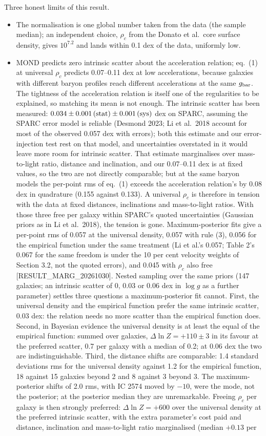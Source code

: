 \documentclass[
  10pt,
]{article}
\begin{document}
Three honest limits of this result.
\begin{itemize}
\item[(i)] The normalisation is one global number taken from the data (the sample median); an independent choice, $\rho_c$ from the Donato et al.~core surface density, gives $10^{7.2}$ and lands within 0.1 dex of the data, uniformly low.
\item[(ii)] MOND predicts zero intrinsic scatter about the acceleration relation; eq.~(1) at universal $\rho_c$ predicts 0.07--0.11 dex at low accelerations, because galaxies with different baryon profiles reach different accelerations at the same $g_{\rm bar}$. The tightness of the acceleration relation is itself one of the regularities to be explained, so matching its mean is not enough. The intrinsic scatter has been measured: $0.034\pm0.001\,{\rm(stat)}\pm0.001\,{\rm(sys)}$ dex on SPARC, assuming the SPARC error model is reliable (Desmond 2023; Li et al.~2018 account for most of the observed 0.057 dex with errors); both this estimate and our error-injection test rest on that model, and uncertainties overstated in it would leave more room for intrinsic scatter. That estimate marginalises over mass-to-light ratio, distance and inclination, and our 0.07--0.11 dex is at fixed values, so the two are not directly comparable; but at the same baryon models the per-point rms of eq.~(1) exceeds the acceleration relation's by 0.08 dex in quadrature (0.155 against 0.133). A universal $\rho_c$ is therefore in tension with the data at fixed distances, inclinations and mass-to-light ratios. With those three free per galaxy within SPARC's quoted uncertainties (Gaussian priors as in Li et al.~2018), the tension is gone. Maximum-posterior fits give a per-point rms of 0.057 at the universal density, 0.057 with rule (3), 0.056 for the empirical function under the same treatment (Li et al.'s 0.057; Table 2's 0.067 for the same freedom is under the 10 per cent velocity weights of Section 3.2, not the quoted errors), and 0.045 with $\rho_c$ also free {[}RESULT\_MARG\_20261030{]}. Nested sampling over the same priors (147 galaxies; an intrinsic scatter of 0, 0.03 or 0.06 dex in $\log g$ as a further parameter) settles three questions a maximum-posterior fit cannot. First, the universal density and the empirical function prefer the same intrinsic scatter, 0.03 dex: the relation needs no more scatter than the empirical function does. Second, in Bayesian evidence the universal density is at least the equal of the empirical function: summed over galaxies, $\Delta\ln Z=+110\pm3$ in its favour at the preferred scatter, 0.7 per galaxy with a median of 0.2; at 0.06 dex the two are indistinguishable. Third, the distance shifts are comparable: 1.4 standard deviations rms for the universal density against 1.2 for the empirical function, 18 against 15 galaxies beyond 2 and 8 against 3 beyond 3. The maximum-posterior shifts of 2.0 rms, with IC 2574 moved by $-10$, were the mode, not the posterior; at the posterior median they are unremarkable. Freeing $\rho_c$ per galaxy is then strongly preferred: $\Delta\ln Z=+600$ over the universal density at the preferred intrinsic scatter, with the extra parameter's cost paid and distance, inclination and mass-to-light ratio marginalised (median $+0.13$ per 
\end{itemize}
\end{document}
